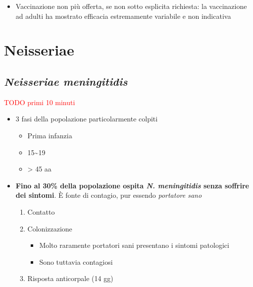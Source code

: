 \documentclass[italian,]{article}
\providecommand{\tightlist}{%
  \setlength{\itemsep}{0pt}\setlength{\parskip}{0pt}}
\newcommand{\TODO}[1]{\textcolor{red}{\textsf{\footnotesize{TODO #1}}}} %
\begin{document}
\begin{itemize}
  \begin{itemize}
  \tightlist
  \item
    Vaccinazione non più offerta, se non sotto esplicita richiesta: la
    vaccinazione ad adulti ha mostrato efficacia estremamente variabile
    e non indicativa
  \end{itemize}
\end{itemize}

\hypertarget{neisseriae}{%
\section{Neisseriae}\label{neisseriae}}

\hypertarget{neisseriae-meningitidis}{%
\subsection{\texorpdfstring{\emph{Neisseriae
meningitidis}}{Neisseriae meningitidis}}\label{neisseriae-meningitidis}}

\TODO{primi 10 minuti}

\begin{itemize}
\tightlist
\item
  3 fasi della popolazione particolarmente colpiti

  \begin{itemize}
  \tightlist
  \item
    Prima infanzia
  \item
    15\textasciitilde{}19
  \item
    \textgreater{} 45 aa
  \end{itemize}
\item
  \textbf{Fino al 30\% della popolazione ospita \emph{N. meningitidis}
  senza soffrire dei sintomi}. È fonte di contagio, pur essendo
  \emph{portatore sano}

  \begin{enumerate}
  \def\labelenumi{\arabic{enumi}.}
  \setcounter{enumi}{-1}
  \tightlist
  \item
    Contatto
  \item
    Colonizzazione

    \begin{itemize}
    \tightlist
    \item
      Molto raramente portatori sani presentano i sintomi patologici
    \item
      Sono tuttavia contagiosi
    \end{itemize}
  \item
    Risposta anticorpale (14 gg)
  \end{enumerate}
\end{itemize}
\end{document}
